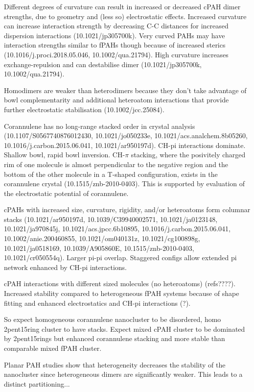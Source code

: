 Different degrees of curvature can result in increased or decreased cPAH dimer strengths, due to geometry and (less so) electrostatic effects. Increased curvature can increase interaction strength by decreasing C-C distances for increased dispersion interactions (10.1021/jp305700k). Very curved PAHs may have interaction strengths similar to fPAHs though because of increased sterics (10.1016/j.proci.2018.05.046, 10.1002/qua.21794). High curvature increases exchange-repulsion and can destabilise dimer (10.1021/jp305700k, 10.1002/qua.21794).

Homodimers are weaker than heterodimers because they don't take advantage of bowl complementarity and additional heteroatom interactions that provide further electrostatic stabilisation (10.1002/jcc.25084).


Corannulene has no long-range stacked order in crystal analysis (10.1107/S0567740876012430, 10.1021/jo050233e, 10.1021/acs.analchem.8b05260, 10.1016/j.carbon.2015.06.041, 10.1021/ar950197d). CH-pi interactions dominate. Shallow bowl, rapid bowl inversion.
CH-$\pi$ stacking, where the posivitely charged rim of one molecule is almost perpendicular to the negative region and the bottom of the other molecule in a T-shaped configuration, exists in the corannulene crystal (10.1515/znb-2010-0403). This is supported by evaluation of the electrostatic potential of corannulene.

cPAHs with increased size, curvature, rigidity, and/or heteroatoms form columnar stacks (10.1021/ar950197d, 10.1039/C39940002571, 10.1021/ja0123148, 10.1021/ja970845j, 10.1021/acs.jpcc.6b10895, 10.1016/j.carbon.2015.06.041, 10.1002/anie.200460855, 10.1021/om040131z, 10.1021/cg100898g, 10.1021/ja0518169, 10.1039/A905860E, 10.1515/znb-2010-0403, 10.1021/cr050554q). Larger pi-pi overlap. Staggered configs allow extended pi network enhanced by CH-pi interactions.

cPAH interactions with different sized molecules (no heteroatoms) (refs????). Increased stability compared to heterogeneous fPAH systems because of shape fitting and enhanced electrostatics and CH-pi interactions (?).

So expect homogeneous corannulene nanocluster to be disordered, homo 2pent15ring cluster to have stacks. Expect mixed cPAH cluster to be dominated by 2pent15rings but enhanced corannulene stacking and more stable than comparable mixed fPAH cluster.


Planar PAH studies show that heterogeneity decreases the stability of the nanocluster since heterogeneous dimers are significantly weaker.  This leads to a distinct partitioning...

